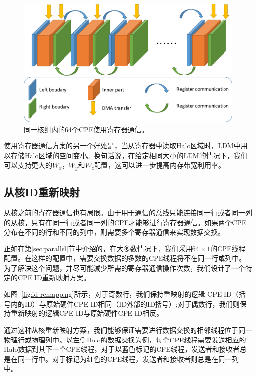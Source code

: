 \documentclass[degree=doctor]{thuthesis}
\begin{document}
\begin{figure}[ht]
\centering
\includegraphics[width=0.7\columnwidth]{awp_using_register.png}
\caption{同一核组内的64个CPE使用寄存器通信。}
\label{fig:64by1-reg}
\end{figure}

使用寄存器通信方案的另一个好处是，当从寄存器中读取Halo区域时，LDM中用以存储Halo区域的空间变小。换句话说，在给定相同大小的LDM的情况下，我们可以支持更大的$ W_x $，$ W_y $和$ W_z $配置，这可以进一步提高内存带宽利用率。

\subsection{从核ID重新映射}
\label{sub:从核ID重新映射}
从核之前的寄存器通信也有局限。由于用于通信的总线只能连接同一行或者同一列的从核，只有在同一行或者同一列的CPE才能够进行寄存器通信。如果两个CPE分布在不同的行和不同的列中，则需要多个寄存器通信来实现数据交换。

正如在第\ref{sec:parallel}节中介绍的，在大多数情况下，我们采用$ 64 \times1 $的CPE线程配置。在这样的配置中，需要交换数据的多数的CPE线程将不在同一行或列中。为了解决这个问题，并尽可能减少所需的寄存器通信操作次数，我们设计了一个特定的CPE ID重新映射方案。

如图~\ref{fig:id-remapping}所示，对于奇数行，我们保持重映射的逻辑 CPE ID（括号内的ID）与原始硬件CPE ID相同（ID外部的ID括号）;对于偶数行，我们则保持重新映射的逻辑CPE ID与原始硬件CPE ID相反。

通过这种从核重新映射方案，我们能够保证需要进行数据交换的相邻线程位于同一物理行或物理列中。以左侧Halo的数据交换为例，每个CPE线程需要发送相应的Halo数据到其下一个CPE线程。对于以蓝色标记的CPE线程，发送者和接收者总是在同一行中。对于标记为红色的CPE线程，发送者和接收者则总是在同一列中。
\end{document}

